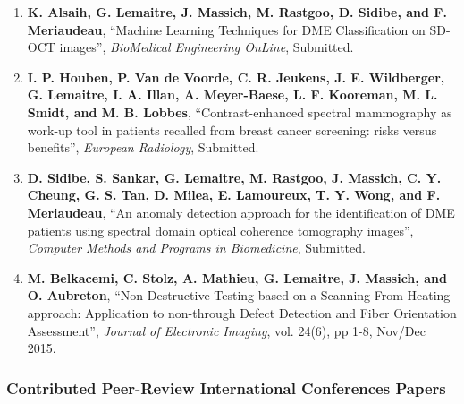 \begin{publication}
\begin{enumerate}\scriptsize
\item \textbf{K. Alsaih, G. Lemaitre, J. Massich, M. Rastgoo, D. Sidibe, and F. Meriaudeau}, ``Machine Learning Techniques for DME Classification on SD-OCT images'', \textit{BioMedical Engineering OnLine}, Submitted.
\item \textbf{I. P. Houben, P. Van de Voorde, C. R. Jeukens, J. E. Wildberger, G. Lemaitre, I. A. Illan, A. Meyer-Baese, L. F. Kooreman, M. L. Smidt, and M. B. Lobbes}, ``Contrast-enhanced spectral mammography as work-up tool in patients recalled from breast cancer screening: risks versus benefits'', \textit{European Radiology}, Submitted.
\item \textbf{D. Sidibe, S. Sankar, G. Lemaitre, M. Rastgoo, J. Massich, C. Y. Cheung, G. S. Tan, D. Milea, E. Lamoureux, T. Y. Wong, and F. Meriaudeau}, ``An anomaly detection approach for the identification of DME patients using spectral domain optical coherence tomography images'', \textit{Computer Methods and Programs in Biomedicine}, Submitted.
\item \textbf{M. Belkacemi, C. Stolz, A. Mathieu, G. Lemaitre, J. Massich, and O. Aubreton}, ``Non Destructive Testing based on a Scanning-From-Heating approach: Application to non-through Defect Detection and Fiber Orientation Assessment'', \textit{Journal of Electronic Imaging}, vol. 24(6), pp 1-8, Nov/Dec 2015.
\end{enumerate}

\subsubsection*{Contributed Peer-Review International Conferences Papers}


\end{publication}
